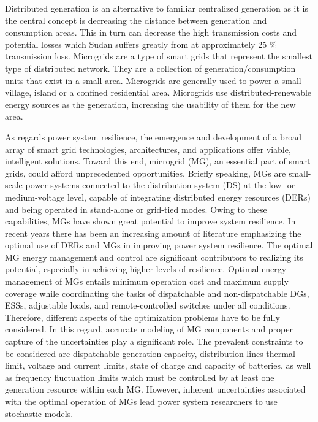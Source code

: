 \documentclass[conference]{IEEEtran}
\begin{document}
Distributed generation is an alternative to familiar centralized generation as it is the central concept is decreasing the distance between generation and consumption areas. This in turn can decrease the high transmission costs and potential losses which Sudan suffers greatly from at approximately 25 \% transmission loss. Microgrids are a type of smart grids that represent the smallest type of distributed network. They are a collection of generation/consumption units that exist in a small area. Microgrids are generally used to power a small village, island or a confined residential area. Microgrids use distributed-renewable energy sources as the generation, increasing the usability of them for the new area.

As regards power system resilience, the emergence and development of a broad array of smart grid technologies, architectures, and applications offer viable, intelligent solutions. Toward this end, microgrid (MG), an essential part of smart grids, could afford unprecedented opportunities. Briefly speaking, MGs are small-scale power systems connected to the distribution system (DS) at the low- or medium-voltage level, capable of integrating distributed energy resources (DERs) and being operated in stand-alone or grid-tied modes. Owing to these capabilities, MGs have shown great potential to improve system resilience. In recent years there has been an increasing amount of literature emphasizing the optimal use of DERs and MGs in improving power system resilience. The optimal MG energy management and control are significant contributors to realizing its potential, especially in achieving higher levels of resilience. Optimal energy management of MGs entails minimum operation cost and maximum supply coverage while coordinating the tasks of dispatchable and non-dispatchable DGs, ESSs, adjustable loads, and remote-controlled switches under all conditions. Therefore, different aspects of the optimization problems have to be fully considered. In this regard, accurate modeling of MG components and proper capture of the uncertainties play a significant role. The prevalent constraints to be considered are dispatchable generation capacity, distribution lines thermal limit, voltage and current limits, state of charge and capacity of batteries, as well as frequency fluctuation limits which must be controlled by at least one generation resource within each MG. However, inherent uncertainties associated with the optimal operation of MGs lead power system researchers to use stochastic models.
\end{document}
